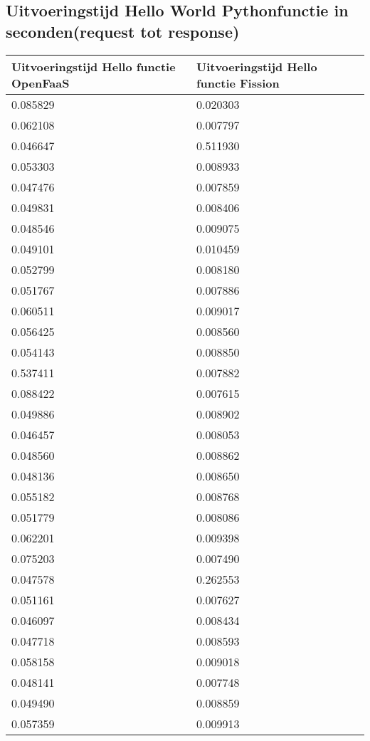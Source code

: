 \subsection{Uitvoeringstijd  Hello World Pythonfunctie in seconden(request tot response)}
\label{sec:uitvoeringstijd-hello-world}
\begin{longtable}[c]{ll}
    \textbf{Uitvoeringstijd Hello functie OpenFaaS} & \textbf{Uitvoeringstijd Hello functie Fission} \\
    \endfirsthead
    \endhead
    0.085829 & 0.020303 \\
    0.062108 & 0.007797 \\
    0.046647 & 0.511930 \\
    0.053303 & 0.008933 \\
    0.047476 & 0.007859 \\
    0.049831 & 0.008406 \\
    0.048546 & 0.009075 \\
    0.049101 & 0.010459 \\
    0.052799 & 0.008180 \\
    0.051767 & 0.007886 \\
    0.060511 & 0.009017 \\
    0.056425 & 0.008560 \\
    0.054143 & 0.008850 \\
    0.537411 & 0.007882 \\
    0.088422 & 0.007615 \\
    0.049886 & 0.008902 \\
    0.046457 & 0.008053 \\
    0.048560 & 0.008862 \\
    0.048136 & 0.008650 \\
    0.055182 & 0.008768 \\
    0.051779 & 0.008086 \\
    0.062201 & 0.009398 \\
    0.075203 & 0.007490 \\
    0.047578 & 0.262553 \\
    0.051161 & 0.007627 \\
    0.046097 & 0.008434 \\
    0.047718 & 0.008593 \\
    0.058158 & 0.009018 \\
    0.048141 & 0.007748 \\
    0.049490 & 0.008859 \\
    0.057359 & 0.009913 \\

\end{longtable}

